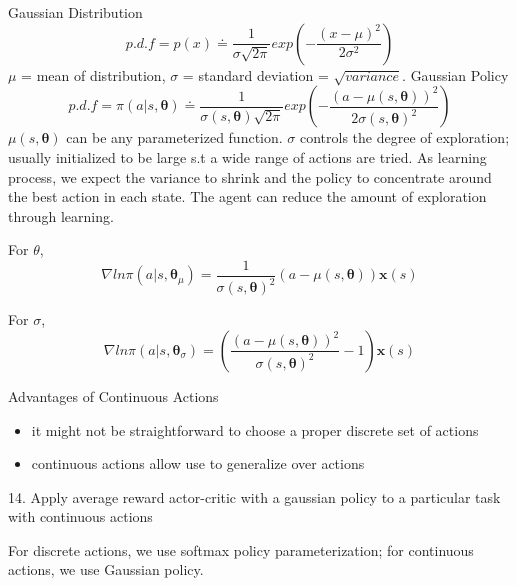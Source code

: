 \documentclass[sutton_barto_notes.tex]{subfiles}
\begin{document}
Gaussian Distribution
$$ p.d.f = p(x) \doteq \frac{1}{\sigma \sqrt{2\pi}}exp( -\frac{(x-\mu)^2}{2\sigma^2} )$$
$\mu$ = mean of distribution, $\sigma$ = standard deviation = $\sqrt{variance}$.
Gaussian Policy
$$ p.d.f = \pi(a|s,\bm{\theta}) \doteq \frac{1}{\sigma(s,\bm{\theta}) \sqrt{2\pi}}exp( -\frac{(a-\mu(s,\bm{\theta}))^2}{2\sigma(s,\bm{\theta})^2} )$$
$\mu(s,\bm{\theta})$ can be any parameterized function.
$\sigma$ controls the degree of exploration; usually initialized to be large s.t a wide range of actions are tried. As learning process, we expect the variance to shrink and the policy to concentrate around the best action in each state. The agent can reduce the amount of exploration through learning.

For $\theta$,
$$\nabla ln\pi(a|s, \bm{\theta}_\mu) = \frac{1}{\sigma(s,\bm{\theta})^2}(a-\mu(s,\bm{\theta}))\bm{x}(s)$$

For $\sigma$,
$$\nabla ln\pi(a|s, \bm{\theta}_\sigma) = (\frac{( a- \mu(s,\bm{\theta}) )^2}{\sigma(s,\bm{\theta})^2} - 1) \bm{x}(s)$$

Advantages of Continuous Actions
\begin{itemize}
\item it might not be straightforward to choose a proper discrete set of actions
\item continuous actions allow use to generalize over actions
\end{itemize}


14. Apply average reward actor-critic with a gaussian policy to a particular task with continuous actions

For discrete actions, we use softmax policy parameterization; for continuous actions, we use Gaussian policy.
\end{document}
